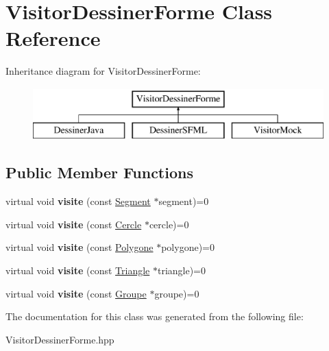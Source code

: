 \hypertarget{class_visitor_dessiner_forme}{}\section{Visitor\+Dessiner\+Forme Class Reference}
\label{class_visitor_dessiner_forme}
Inheritance diagram for Visitor\+Dessiner\+Forme\+:\begin{figure}[H]
\begin{center}
\leavevmode
\includegraphics[height=2.000000cm]{class_visitor_dessiner_forme}
\end{center}
\end{figure}
\subsection*{Public Member Functions}
\begin{DoxyCompactItemize}
\item 
\mbox{\label{class_visitor_dessiner_forme_aadc4ead0697b9349872a289ac4604f7d}} 
virtual void {\bfseries visite} (const \mbox{\hyperlink{class_segment}{Segment}} $\ast$segment)=0
\item 
\mbox{\label{class_visitor_dessiner_forme_a4881bc992988c9060a008dbdbcbe4821}} 
virtual void {\bfseries visite} (const \mbox{\hyperlink{class_cercle}{Cercle}} $\ast$cercle)=0
\item 
\mbox{\label{class_visitor_dessiner_forme_a5b97e02402aedb16e277a149eddb157b}} 
virtual void {\bfseries visite} (const \mbox{\hyperlink{class_polygone}{Polygone}} $\ast$polygone)=0
\item 
\mbox{\label{class_visitor_dessiner_forme_a78aba230dab952c94caee111df6e1985}} 
virtual void {\bfseries visite} (const \mbox{\hyperlink{class_triangle}{Triangle}} $\ast$triangle)=0
\item 
\mbox{\label{class_visitor_dessiner_forme_aff5607ed60e07251ae41f526ae4f0263}} 
virtual void {\bfseries visite} (const \mbox{\hyperlink{class_groupe}{Groupe}} $\ast$groupe)=0
\end{DoxyCompactItemize}


The documentation for this class was generated from the following file\+:\begin{DoxyCompactItemize}
\item 
Visitor\+Dessiner\+Forme.\+hpp\end{DoxyCompactItemize}
